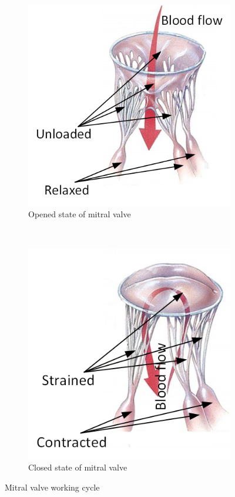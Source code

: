 \begin{figure}[H]\label{fig:workingMT}      
  \centering
  \begin{subfigure}[b]{0.4\textwidth}\label{fig:openMT}
    \includegraphics[width=\textwidth]{./fig/openMT.png}
      \caption{Opened state of mitral valve}      
  \end{subfigure}
  ~
  ~ %
  \begin{subfigure}[b]{0.4\textwidth}\label{fig:closedMT}  
    \includegraphics[width=\textwidth]{./fig/closedMT.png}
      \caption{Closed state of mitral valve}    
  \end{subfigure}
  \caption{Mitral valve working cycle}
\end{figure} 


